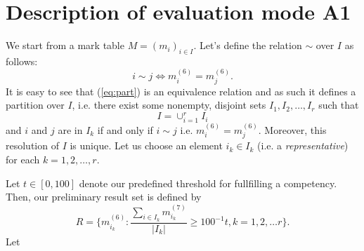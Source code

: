 \documentclass{scrartcl}
\begin{document}
\section{Description of evaluation mode A1}
We start from a mark table $M=(m_i)_{i\in I}$. Let's define the relation $\sim$ over $I$ as follows:
\begin{equation}
i\sim j \Leftrightarrow m_i^{(6)}=m_j^{(6)}.
\label{eq:part}
\end{equation}
It is easy to see that (\ref{eq:part}) is an equivalence relation and as such it defines a partition over $I$, i.e. there exist some nonempty, disjoint sets $I_1,I_2,\ldots,I_r$ such that $$I=\cup_{i=1}^r I_i$$ and $i$ and $j$ are in $I_k$ if and only if $i\sim j$ i.e. $m_i^{(6)}=m_j^{(6)}$. Moreover, this resolution of $I$ is unique. Let us choose an element $i_k\in I_k$ (i.e. a \emph{representative}) for each $k=1,2,\ldots,r$.

Let $t\in [0,100]$ denote our predefined threshold for fullfilling a competency. Then, our preliminary result set is defined by 
$$R=\{m_{i_k}^{(6)}: \frac{\sum_{i \in I_k}m_{i_k}^{(7)}}{|I_k|}\geq 100^{-1}t, k=1,2,\ldots r\}.$$
Let 
\end{document}
